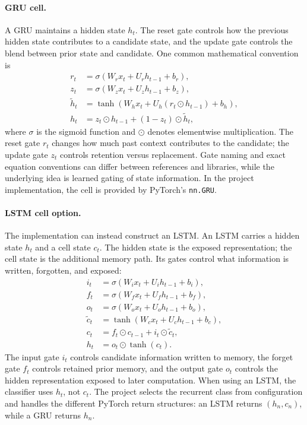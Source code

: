 \documentclass[11pt,a4paper]{article}
\begin{document}
\paragraph{GRU cell.} A GRU maintains a hidden state \(h_t\). The reset gate controls how the previous hidden state contributes to a candidate state, and the update gate controls the blend between prior state and candidate. One common mathematical convention is
\begin{align}
r_t &= \sigma(W_r x_t+U_r h_{t-1}+b_r),\\
z_t &= \sigma(W_z x_t+U_z h_{t-1}+b_z),\\
\widetilde{h}_t
&=\tanh\!\left(W_hx_t+U_h(r_t\odot h_{t-1})+b_h\right),\\
h_t &= z_t\odot h_{t-1}
 +(1-z_t)\odot\widetilde{h}_t,
\end{align}
where \(\sigma\) is the sigmoid function and \(\odot\) denotes elementwise multiplication. The reset gate \(r_t\) changes how much past context contributes to the candidate; the update gate \(z_t\) controls retention versus replacement. Gate naming and exact equation conventions can differ between references and libraries, while the underlying idea is learned gating of state information. In the project implementation, the cell is provided by PyTorch's \texttt{nn.GRU}.

\paragraph{LSTM cell option.} The implementation can instead construct an LSTM. An LSTM carries a hidden state \(h_t\) and a cell state \(c_t\). The hidden state is the exposed representation; the cell state is the additional memory path. Its gates control what information is written, forgotten, and exposed:
\begin{align}
i_t &= \sigma(W_i x_t+U_i h_{t-1}+b_i),\\
f_t &= \sigma(W_f x_t+U_f h_{t-1}+b_f),\\
o_t &= \sigma(W_o x_t+U_o h_{t-1}+b_o),\\
\widetilde{c}_t &= \tanh(W_c x_t+U_c h_{t-1}+b_c),\\
c_t &= f_t\odot c_{t-1}+i_t\odot\widetilde{c}_t,\\
h_t &= o_t\odot\tanh(c_t).
\end{align}
The input gate \(i_t\) controls candidate information written to memory, the forget gate \(f_t\) controls retained prior memory, and the output gate \(o_t\) controls the hidden representation exposed to later computation. When using an LSTM, the classifier uses \(h_t\), not \(c_t\). The project selects the recurrent class from configuration and handles the different PyTorch return structures: an LSTM returns \((h_n,c_n)\), while a GRU returns \(h_n\).
\end{document}
